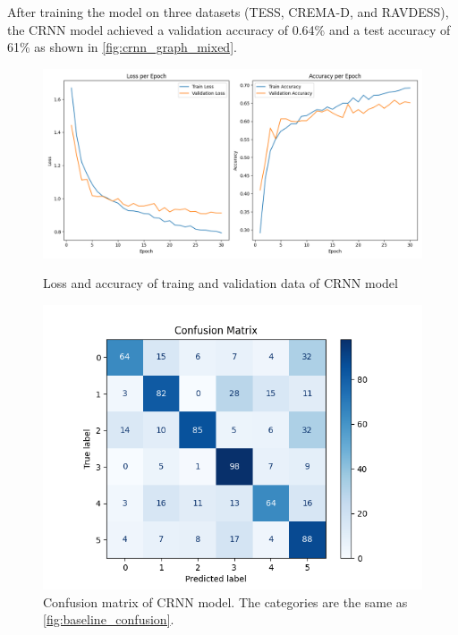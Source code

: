 \documentclass[../main.tex]{subfiles}
\begin{document}
After training the model on three datasets (TESS, CREMA-D, and RAVDESS), the 
CRNN model achieved a validation accuracy of 0.64\% and a test accuracy of 61\%
as shown in \autoref{fig:crnn_graph_mixed}.

\begin{figure}[ht]
    \centering
    \begin{minipage}{.5\textwidth}
      \centering
      \includegraphics[width=1.0\linewidth]{../resources/crnn_graph_mixed.png}
      \caption{Loss and accuracy of traing and validation data of CRNN model}
      \label{fig:crnn_graph_mixed}
    \end{minipage}%
    \hfill
    \begin{minipage}{.4\textwidth}
      \centering
      \includegraphics[width=1.0\linewidth]{../resources/crnn_confusion.png}
      \caption{Confusion matrix of CRNN model. The categories are the same 
      as \autoref{fig:baseline_confusion}.} 
      \label{fig:crnn_confusion}
    \end{minipage}
\end{figure}
\end{document}
